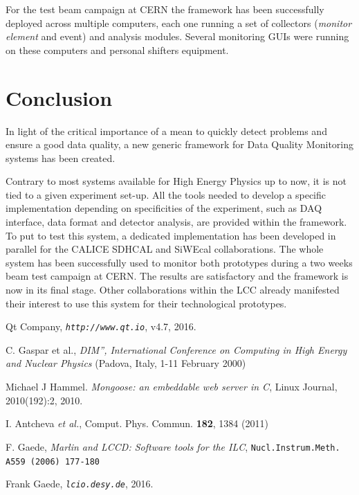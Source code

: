 \documentclass[conference]{IEEEtran}
\begin{document}
For the test beam campaign at CERN the framework has been successfully deployed across multiple computers, each one running a set of collectors (\textit{monitor element} and event) and analysis modules. Several monitoring GUIs were running on these computers and personal shifters equipment.


\section{Conclusion}
In light of the critical importance of a mean to quickly detect problems and ensure a good data quality, a new generic framework for Data Quality Monitoring systems has been created.

Contrary to most systems available for High Energy Physics up to now, it is not tied to a given experiment set-up. All the tools needed to develop a specific implementation depending on specificities of the experiment, such as DAQ interface, data format and detector analysis, are provided within the framework.
To put to test this system, a dedicated implementation has been developed in parallel for the CALICE SDHCAL and SiWEcal collaborations. The whole system has been successfully used to monitor both prototypes during a two weeks beam test campaign at CERN. The results are satisfactory and the framework is now in its final stage. Other collaborations within the LCC already manifested their interest to use this system for their technological prototypes.

\begin{thebibliography}{1}
  
Qt Company, \emph{\tt http://www.qt.io}, v4.7, 2016.

C. Gaspar et al., \emph{DIM”, International Conference on Computing in High Energy and Nuclear Physics} (Padova,  Italy,
1-11 February 2000)

Michael J Hammel. \emph{Mongoose: an embeddable web server in C}, Linux Journal, 2010(192):2, 2010.

I. Antcheva \textit{et al.}, Comput. Phys. Commun. \textbf{182}, 1384 (2011)

F. Gaede, {\it Marlin and LCCD: Software tools for the ILC}, {\tt Nucl.Instrum.Meth. A559 (2006) 177-180}

Frank Gaede, \emph{\tt lcio.desy.de}, 2016.

\end{thebibliography}
  
\end{document}
